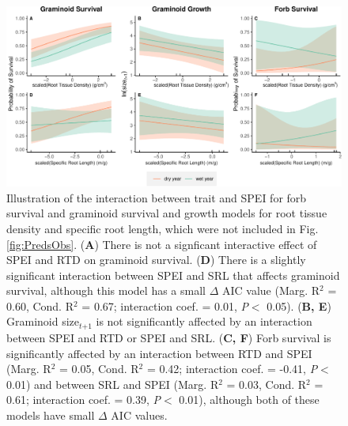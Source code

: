 \documentclass[12pt, letterpaper]{article}
\begin{document}
\begin{figure}
\includegraphics[width=.8\textwidth]{suppObservationsFig-1.pdf}
\caption{\internallinenumbers\small{
Illustration of the interaction between trait and SPEI for forb survival and graminoid survival and growth models for root tissue density and specific root length, which were not included in Fig. \ref{fig:PredsObs}. (\textbf{A}) There is not a signficant interactive effect of SPEI and RTD on graminoid survival. (\textbf{D}) There is a slightly significant interaction between SPEI and SRL that affects graminoid survival, although this model has a small $\Delta$ AIC value (Marg. R$^2$ = 0.60, Cond. R$^2$ = 0.67; interaction coef. = 0.01, \textit{P}$<$ 0.05). (\textbf{B, E}) Graminoid size$_\textit{t+1}$ is not significantly affected by an interaction between SPEI and RTD or SPEI and SRL. (\textbf{C, F}) Forb survival is significantly affected by an interaction between RTD and SPEI (Marg. R$^2$ = 0.05, Cond. R$^2$ = 0.42; interaction coef. = -0.41, \textit{P}$<$ 0.01) and between SRL and SPEI (Marg. R$^2$ = 0.03, Cond. R$^2$ = 0.61; interaction coef. = 0.39, \textit{P}$<$ 0.01), although both of these models have small $\Delta$ AIC values.
}}
\label{fig:GramSurv_all}
\end{figure}
\end{document}
